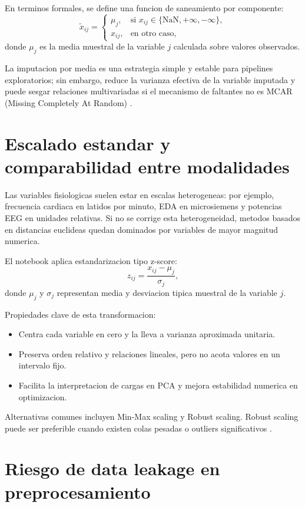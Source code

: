 \documentclass[12pt,a4paper,oneside]{report}
\begin{document}
En terminos formales, se define una funcion de saneamiento por componente:
\[
\tilde{x}_{ij} =
\begin{cases}
\mu_j, & \text{si } x_{ij} \in \{\mathrm{NaN}, +\infty, -\infty\},\\
x_{ij}, & \text{en otro caso},
\end{cases}
\]
donde $\mu_j$ es la media muestral de la variable $j$ calculada sobre valores observados.

La imputacion por media es una estrategia simple y estable para pipelines exploratorios; sin embargo, reduce la varianza efectiva de la variable imputada y puede sesgar relaciones multivariadas si el mecanismo de faltantes no es MCAR (Missing Completely At Random) \cite{little2019}.

\section{Escalado estandar y comparabilidad entre modalidades}

Las variables fisiologicas suelen estar en escalas heterogeneas: por ejemplo, frecuencia cardiaca en latidos por minuto, EDA en microsiemens y potencias EEG en unidades relativas. Si no se corrige esta heterogeneidad, metodos basados en distancias euclideas quedan dominados por variables de mayor magnitud numerica.

El notebook aplica estandarizacion tipo z-score:
\[
z_{ij} = \frac{x_{ij} - \mu_j}{\sigma_j},
\]
donde $\mu_j$ y $\sigma_j$ representan media y desviacion tipica muestral de la variable $j$.

Propiedades clave de esta transformacion:
\begin{itemize}
\item Centra cada variable en cero y la lleva a varianza aproximada unitaria.
\item Preserva orden relativo y relaciones lineales, pero no acota valores en un intervalo fijo.
\item Facilita la interpretacion de cargas en PCA y mejora estabilidad numerica en optimizacion.
\end{itemize}

Alternativas comunes incluyen Min-Max scaling y Robust scaling. Robust scaling puede ser preferible cuando existen colas pesadas o outliers significativos \cite{hastie2009}.

\section{Riesgo de data leakage en preprocesamiento}
\end{document}
